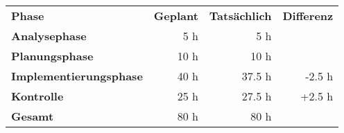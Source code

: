 \begin{tabular}{lrrr}
\rowcolor{heading}\textbf{Phase} & \textbf{Geplant} & \textbf{Tatsächlich} & \textbf{Differenz} \\
\textbf{Analysephase} & 5 h   & 5 h  & \\
\rowcolor{odd}\textbf{Planungsphase} & 10 h  & 10 h  &  \\
\textbf{Implementierungsphase} & 40 h  & 37.5 h  & -2.5 h \\
\rowcolor{odd}\textbf{Kontrolle} & 25 h   & 27.5 h   & +2.5 h \\
\hline
\hline
\rowcolor{odd}\textbf{Gesamt} & 80 h  & 80 h  &  \\
\end{tabular}
